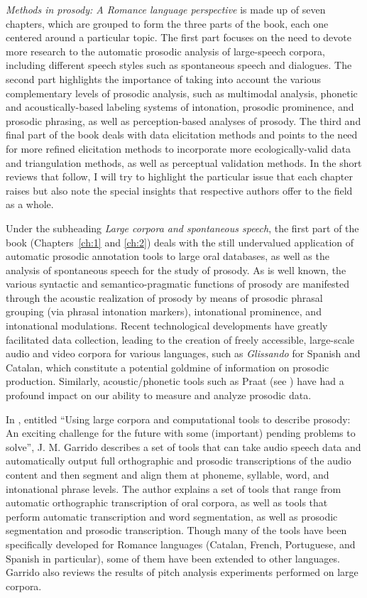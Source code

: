 \documentclass[output=paper]{langsci/langscibook}
\begin{document}
\textit{Methods in prosody: A Romance language perspective} is made up of seven chapters, which are grouped to form the three parts of the book, each one centered around a particular topic. The first part focuses on the need to devote more research to the automatic prosodic analysis of large-speech corpora, including different speech styles such as spontaneous speech and dialogues. The second part highlights the importance of taking into account the various complementary levels of prosodic analysis, such as multimodal analysis, phonetic and acoustically-based labeling systems of intonation, prosodic prominence, and prosodic phrasing, as well as perception-based analyses of prosody. The third and final part of the book deals with data elicitation methods and points to the need for more refined elicitation methods to incorporate more ecologically-valid data and triangulation methods, as well as perceptual validation methods. In the short reviews that follow, I will try to highlight the particular issue that each chapter raises but also note the special insights that respective authors offer to the field as a whole.

Under the subheading \textit{Large corpora and spontaneous speech}, the first part of the book (Chapters~\ref{ch:1} and \ref{ch:2}) deals with the still undervalued application of automatic prosodic annotation tools to large oral databases, as well as the analysis of spontaneous speech for the study of prosody. As is well known, the various syntactic and semantico-pragmatic functions of prosody are manifested through the acoustic realization of prosody by means of prosodic phrasal grouping (via phrasal intonation markers), intonational prominence, and intonational modulations. Recent technological developments have greatly facilitated data collection, leading to the creation of freely accessible, large-scale audio and video corpora for various languages, such as \textit{Glissando} for Spanish and Catalan, which constitute a potential goldmine of information on prosodic production. Similarly, acoustic\slash phonetic tools such as Praat (see \citealt{Boersma.praat}) have had a profound impact on our ability to measure and analyze prosodic data. 


In \textbf{}, entitled ``Using large corpora and computational tools to describe prosody: An exciting challenge for the future with some (important) pending problems to solve”, J. M. Garrido describes a set of tools that can take audio speech data and automatically output full orthographic and prosodic transcriptions of the audio content and then segment and align them at phoneme, syllable, word, and intonational phrase levels. The author explains a set of tools that range from automatic orthographic transcription of oral corpora, as well as tools that perform automatic transcription and word segmentation, as well as prosodic segmentation and prosodic transcription. Though many of the tools have been specifically developed for Romance languages (Catalan, French, Portuguese, and Spanish in particular), some of them have been extended to other languages. Garrido also reviews the results of pitch analysis experiments performed on large corpora. 
\end{document}

